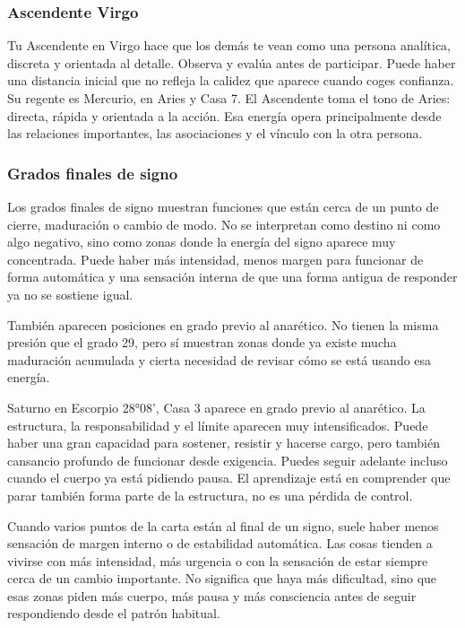 \documentclass[11pt,a4paper]{article}\usepackage[utf8]{inputenc}
\begin{document}
\subsubsection*{Ascendente Virgo}
Tu Ascendente en Virgo hace que los demás te vean como una persona analítica, discreta y orientada al detalle. Observa y evalúa antes de participar. Puede haber una distancia inicial que no refleja la calidez que aparece cuando coges confianza. Su regente es Mercurio, en Aries y Casa 7. El Ascendente toma el tono de Aries: directa, rápida y orientada a la acción. Esa energía opera principalmente desde las relaciones importantes, las asociaciones y el vínculo con la otra persona.

\subsubsection*{Grados finales de signo}
Los grados finales de signo muestran funciones que están cerca de un punto de cierre, maduración o cambio de modo. No se interpretan como destino ni como algo negativo, sino como zonas donde la energía del signo aparece muy concentrada. Puede haber más intensidad, menos margen para funcionar de forma automática y una sensación interna de que una forma antigua de responder ya no se sostiene igual.

También aparecen posiciones en grado previo al anarético. No tienen la misma presión que el grado 29, pero sí muestran zonas donde ya existe mucha maduración acumulada y cierta necesidad de revisar cómo se está usando esa energía.

Saturno en Escorpio 28°08', Casa 3 aparece en grado previo al anarético. La estructura, la responsabilidad y el límite aparecen muy intensificados. Puede haber una gran capacidad para sostener, resistir y hacerse cargo, pero también cansancio profundo de funcionar desde exigencia. Puedes seguir adelante incluso cuando el cuerpo ya está pidiendo pausa. El aprendizaje está en comprender que parar también forma parte de la estructura, no es una pérdida de control.

Cuando varios puntos de la carta están al final de un signo, suele haber menos sensación de margen interno o de estabilidad automática. Las cosas tienden a vivirse con más intensidad, más urgencia o con la sensación de estar siempre cerca de un cambio importante. No significa que haya más dificultad, sino que esas zonas piden más cuerpo, más pausa y más consciencia antes de seguir respondiendo desde el patrón habitual.
\end{document}
